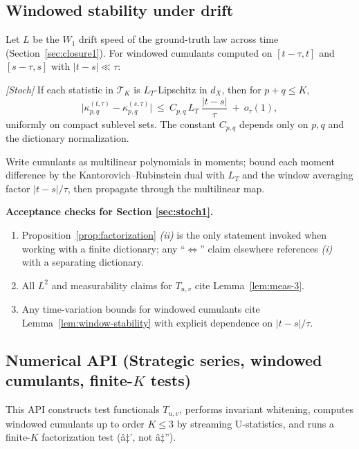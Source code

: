 \subsection{Windowed stability under drift}\label{subsec:window-stability}

Let $L$ be the $W_1$ drift speed of the ground-truth law across time (Section~\ref{sec:closure1}). For windowed cumulants computed on $[t-\tau,t]$ and $[s-\tau,s]$ with $|t-s|\ll \tau$:

\begin{lemma}\label{lem:window-stability}
\emph{[\textup{Stoch}]}
If each statistic in $\mathcal T_K$ is $L_T$-Lipschitz in $d_X$, then for $p+q\le K$,
\[
\Big|\kappa_{p,q}^{(t,\tau)}-\kappa_{p,q}^{(s,\tau)}\Big|
\ \le\ C_{p,q}\,L_T\ \frac{|t-s|}{\tau}\ +\ o_\tau(1),
\]
uniformly on compact sublevel sets. The constant $C_{p,q}$ depends only on $p,q$ and the dictionary normalization.
\begin{proofsketch}
Write cumulants as multilinear polynomials in moments; bound each moment difference by the Kantorovich--Rubinstein dual with $L_T$ and the window averaging factor $|t-s|/\tau$, then propagate through the multilinear map.
\end{proofsketch}
\end{lemma}

\begin{mdframed}
\textbf{Acceptance checks for Section \ref{sec:stoch1}.}
\begin{enumerate}[leftmargin=*]
\item Proposition~\ref{prop:factorization} \emph{(ii)} is the only statement invoked when working with a finite dictionary; any ``$\Leftrightarrow$'' claim elsewhere references \emph{(i)} with a separating dictionary.
\item All $L^2$ and measurability claims for $T_{u,v}$ cite Lemma~\ref{lem:meas-3}.
\item Any time-variation bounds for windowed cumulants cite Lemma~\ref{lem:window-stability} with explicit dependence on $|t-s|/\tau$.
\end{enumerate}
\end{mdframed}

\subsection*{Numerical API (Strategic series, windowed cumulants, finite-\texorpdfstring{$K$}{K} tests)}
\emph{} This API constructs test functionals $T_{u,v}$, performs invariant whitening, computes windowed cumulants up to order $K\le 3$ by streaming U-statistics, and runs a finite-$K$ factorization test (â‡', not â‡'').

